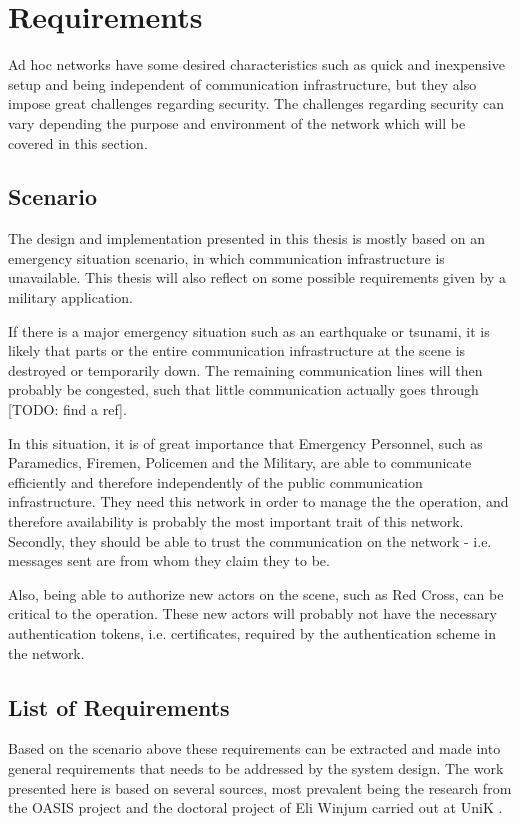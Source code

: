 \section{Requirements}
Ad hoc networks have some desired characteristics such as quick and inexpensive
setup and being independent of communication infrastructure, but they also
impose great challenges regarding security. The challenges regarding security
can vary depending the purpose and environment of the network which will be
covered in this section.

\subsection{Scenario}
The design and implementation presented in this thesis is mostly based on an
emergency situation scenario, in which communication infrastructure is
unavailable. This thesis will also reflect on some possible requirements given
by a military application.

If there is a major emergency situation such as an earthquake or tsunami, it is
likely that parts or the entire communication infrastructure at the scene
is destroyed or temporarily down. The remaining communication lines will then
probably be congested, such that little communication actually goes through
[TODO: find a ref].

In this situation, it is of great importance that Emergency Personnel, such as
Paramedics, Firemen, Policemen and the Military, are able to communicate
efficiently and therefore independently of the public communication
infrastructure. They need this network in order to manage the the operation, and
therefore availability is probably the most important trait of this network.
Secondly, they should be able to trust the communication on the network - i.e.
messages sent are from whom they claim they to be.

Also, being able to authorize new actors on the scene, such as Red Cross, can be
critical to the operation. These new actors will probably not have the necessary
authentication tokens, i.e. certificates, required by the authentication scheme
in the network.

\subsection{List of Requirements}
Based on the scenario above these requirements can be extracted and made into
general requirements that needs to be addressed by the system design. The work
presented here is based on several sources, most prevalent being the research
from the OASIS project \cite{oasis_report} \cite{5683058} \cite{nyre2009secure}
and the doctoral project of Eli Winjum carried out at UniK
\cite{ffi_2005_04015}.

